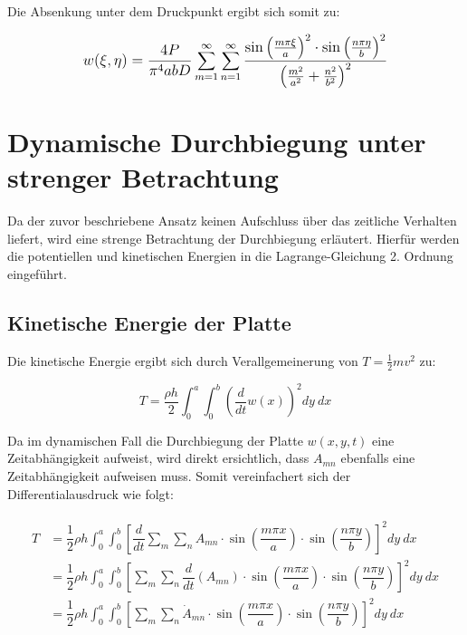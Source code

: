 Die Absenkung unter dem Druckpunkt ergibt sich somit zu:

\begin{equation}
 \mathlarger{
	w(\xi,\eta) = \frac{4P}{\pi^4 a b D} 
	\sum_{m = 1}^{\infty} \sum_{n = 1}^{\infty}
	\frac{
		\sin\left(\frac{m \pi \xi}{a}\right)^2 
		\cdot 	\sin\left(\frac{n \pi \eta}{b}\right) ^2
	}{
		\left( 
		\frac{m^2}{a^2} +
		\frac{n^2}{b^2}
		\right)^2
	}
}
\end{equation}



\section{Dynamische Durchbiegung unter strenger Betrachtung}

Da der zuvor beschriebene Ansatz keinen Aufschluss über das zeitliche Verhalten liefert, wird eine strenge Betrachtung der Durchbiegung erläutert. Hierfür werden die potentiellen und kinetischen Energien in die Lagrange-Gleichung 2. Ordnung eingeführt.

\subsection{Kinetische Energie der Platte}

Die kinetische Energie ergibt sich durch Verallgemeinerung von $T = \frac{1}{2} mv^2$ zu:

\begin{equation}
T = \dfrac{\rho h}{2} \int_{0}^{a} \int_{0}^{b} \left(\dfrac{d}{dt} w(x)\right)^2 dy \ dx
\end{equation}

Da im dynamischen Fall die Durchbiegung der Platte $w(x,y,t)$ eine Zeitabhängigkeit aufweist, wird direkt ersichtlich, dass $A_{mn}$ ebenfalls eine Zeitabhängigkeit aufweisen muss. Somit vereinfachert sich der Differentialausdruck wie folgt:


\begin{align}
\begin{split}
T &= \dfrac{1}{2}\rho h \int_0^a \int_0^b  \left[\dfrac{d}{dt} \sum_m \sum_n A_{mn} \cdot \sin\left(\dfrac{m \pi x}{a}\right) \cdot \sin\left(\dfrac{n \pi y}{b}\right) \right]^2 dy \ dx  \\
&= \dfrac{1}{2} \rho h\int_0^a \int_0^b  \left[ \sum_m \sum_n \dfrac{d}{dt}\left(A_{mn}\right) \cdot \sin\left(\dfrac{m \pi x}{a}\right) \cdot \sin\left(\dfrac{n \pi y}{b}\right) \right]^2 dy \ dx \\
&= \dfrac{1}{2} \rho h \int_0^a \int_0^b  \left[ \sum_m \sum_n \dot{A}_{mn} \cdot \sin\left(\dfrac{m \pi x}{a}\right) \cdot \sin\left(\dfrac{n \pi y}{b}\right) \right]^2 dy \ dx \\
\end{split}
\label{eq:T_general}
\end{align}

